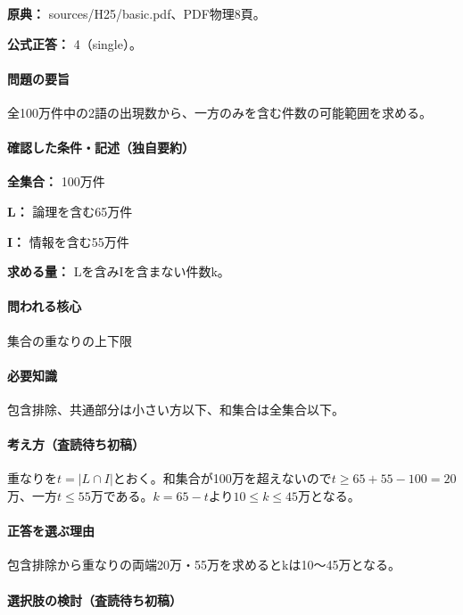 \noindent\textbf{原典：} sources/H25/basic.pdf、PDF物理8頁。

\textbf{公式正答：} 4（single）。

\paragraph{問題の要旨} 全100万件中の2語の出現数から、一方のみを含む件数の可能範囲を求める。

\paragraph{確認した条件・記述（独自要約）}\mbox{}\par

\noindent\textbf{全集合：} 100万件\par

\noindent\textbf{L：} 論理を含む65万件\par

\noindent\textbf{I：} 情報を含む55万件\par

\noindent\textbf{求める量：} Lを含みIを含まない件数k。\par

\paragraph{問われる核心} 集合の重なりの上下限

\paragraph{必要知識} 包含排除、共通部分は小さい方以下、和集合は全集合以下。

\paragraph{考え方（査読待ち初稿）} 重なりを\(t=|L\cap I|\)とおく。和集合が100万を超えないので\(t\ge65+55-100=20\)万、一方\(t\le55\)万である。\(k=65-t\)より\(10\le k\le45\)万となる。

\paragraph{正答を選ぶ理由} 包含排除から重なりの両端20万・55万を求めるとkは10〜45万となる。

\paragraph{選択肢の検討（査読待ち初稿）}\mbox{}\par

